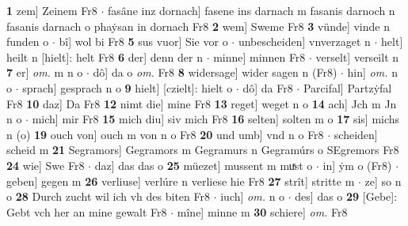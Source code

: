 \documentclass[8pt,a4paper,notitlepage]{article}
\begin{document}
\begin{table}[ht]
\begin{minipage}[t]{0.5\linewidth}
\textbf{1} zem] Zeinem Fr8  $\cdot$ fasâne inz dornach] fasene ins darnach m fasanis darnoch n fasanis darnach o phaẏsan in dornach Fr8 \textbf{2} wem] Sweme Fr8 \textbf{3} vünde] vinde n funden o  $\cdot$ bî] wol bi Fr8 \textbf{5} sus vuor] Sie vor o  $\cdot$ unbescheiden] vnverzaget n  $\cdot$ helt] heilt n [hielt]: helt Fr8 \textbf{6} der] denn der n  $\cdot$ minne] minnen Fr8  $\cdot$ verselt] verseilt n \textbf{7} er] \textit{om.} m n o  $\cdot$ dô] da o \textit{om.} Fr8 \textbf{8} widersage] wider sagen n (Fr8)  $\cdot$ hin] \textit{om.} n o  $\cdot$ sprach] gesprach n o \textbf{9} hielt] [czielt]: hielt o  $\cdot$ dô] da Fr8  $\cdot$ Parcifal] Partzẏfal Fr8 \textbf{10} daz] Da Fr8 \textbf{12} nimt die] mine Fr8 \textbf{13} reget] weget n o \textbf{14} ach] Jch m Jn n o  $\cdot$ mich] mir Fr8 \textbf{15} mich diu] siv mich Fr8 \textbf{16} selten] solten m o \textbf{17} sis] michs n (o) \textbf{19} ouch von] ouch m von n o Fr8 \textbf{20} und umb] vnd n o Fr8  $\cdot$ scheiden] scheid m \textbf{21} Segramors] Gegramors m Gegramurs n Gegramúrs o SEgremors Fr8 \textbf{24} wie] Swe Fr8  $\cdot$ daz] das das o \textbf{25} müezet] mussent m muͯst o  $\cdot$ in] ẏm o (Fr8)  $\cdot$ geben] gegen m \textbf{26} verliuse] verlúre n verliese hie Fr8 \textbf{27} strît] stritte m  $\cdot$ ze] so n o \textbf{28} Durch zucht wil ich vh des biten Fr8  $\cdot$ iuch] \textit{om.} n o  $\cdot$ des] das o \textbf{29} [Gebe]: Gebt vch her an mine gewalt Fr8  $\cdot$ mîne] minne m \textbf{30} schiere] \textit{om.} Fr8 \newline
\end{minipage}
\end{table}
\newpage
\end{document}
